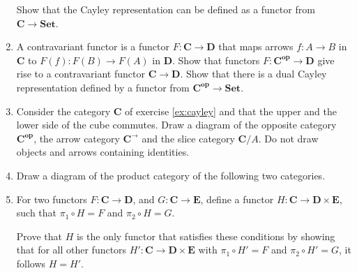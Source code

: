 \documentclass{scrartcl}
\newcommand{\RN}[1]{\textup{\uppercase\expandafter{\romannumeral#1}}}
\newcommand{\Cat}[1]{\mathbf{#1}}
\newcommand{\Op}[1]{#1^{\mathbf{op}}}
\newcommand{\Arr}[1]{#1^{\rightarrow}}
\begin{document}
\begin{enumerate}
  Show that the Cayley representation can be defined as a functor from $\Cat{C} \rightarrow \Cat{Set}$.

\item
  A contravariant functor is a functor $F: \Cat{C} \rightarrow \Cat{D}$ that maps arrows $f: A \rightarrow B$ in $\Cat{C}$ to $F(f): F(B) \rightarrow F(A)$ in $\Cat{D}$.
  Show that functors $F: \Op{\Cat{C}} \rightarrow \Cat{D}$ give rise to a contravariant functor $\Cat{C} \rightarrow \Cat{D}$.
  Show that there is a dual Cayley representation defined by a functor from $\Op{\Cat{C}} \rightarrow \Cat{Set}$.

\item
  Consider the category $\Cat{C}$ of exercise \ref{ex:cayley} and that the upper and the lower side of the cube commutes. Draw a diagram of the opposite category $\Op{\Cat{C}}$, the arrow category $\Arr{\Cat{C}}$ and the slice category $\Cat{C}/A$. Do not draw objects and arrows containing identities.

\item
  Draw a diagram of the product category of the following two categories.
  \begin{center}
  \end{center}

\item
  For two functors $F: \mathbf{C} \rightarrow \mathbf{D}$, and $G: \mathbf{C} \rightarrow \mathbf{E}$, define a functor $H: \mathbf{C} \rightarrow \mathbf{D} \times \mathbf{E}$, such that $\pi_1 \circ H = F$ and $\pi_2 \circ H = G$.
  \begin{center}
  \end{center}
  Prove that $H$ is the only functor that satisfies these conditions by showing that for all other functors $H': \mathbf{C} \rightarrow \mathbf{D} \times \mathbf{E}$ with $\pi_1 \circ H' = F$ and $\pi_2 \circ H' = G$, it follows $H = H'$.


\end{enumerate}
\end{document}
